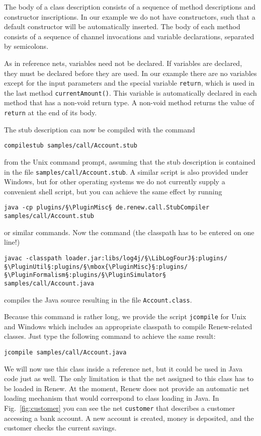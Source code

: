 The body of a class description consists of a sequence of method
descriptions and constructor inscriptions. In our example we do not have
constructors, such that a default constructor will be automatically inserted.
The body of each method consists of a sequence of channel
invocations and variable declarations, separated by semicolons.

As in reference nets, variables need not be declared. If
variables are declared, they must be declared before
they are used. In our example there are no
variables except for the input parameters and the special variable
\texttt{return}, which is used in the last method \texttt{currentAmount()}.
This variable is automatically declared in each method that has a
non-void return type. A non-void method returns the value of
\texttt{return} at the end of its body.

The stub description can now be compiled with the command
\begin{lstlisting}[style=xnonfloating]
  compilestub samples/call/Account.stub
\end{lstlisting}
from the Unix command prompt, assuming that the stub description is contained
in the file \texttt{samples/call/Account.stub}.
A similar script is also provided under Windows, but
for other operating systems we do not currently
supply a convenient shell script, but you can achieve
the same effect by running
\begin{lstlisting}[style=xnonfloating]
  java -cp plugins/§\PluginMisc§ de.renew.call.StubCompiler samples/call/Account.stub
\end{lstlisting}
or similar commands. Now the command
(the classpath has to be entered on one line!)

\begin{lstlisting}[style=xnonfloating]
  javac -classpath loader.jar:libs/log4j/§\LibLogFourJ§:plugins/§\PluginUtil§:plugins/§\mbox{\PluginMisc}§:plugins/§\PluginFormalism§:plugins/§\PluginSimulator§ samples/call/Account.java
 \end{lstlisting}

compiles the Java source resulting in the file
\texttt{Account.class}.

Because this command is rather long, we provide the
script \texttt{jcompile} for Unix and Windows which includes an
appropriate classpath to compile Renew-related classes.
Just type the following command to achieve the same result:
\begin{lstlisting}[style=xnonfloating]
  jcompile samples/call/Account.java
\end{lstlisting}
We will now use this class inside a reference net, but it could be
used in Java code just as well.
The only limitation is that the net assigned to this class has to be
loaded in Renew. At the moment, Renew does not provide an
automatic net loading mechanism that would correspond to
class loading in Java.
In Fig.~\ref{fig:customer} you can see
the net \texttt{customer} that describes a customer accessing a bank
account. A new account is created, money is deposited,
and the customer checks the current savings.

